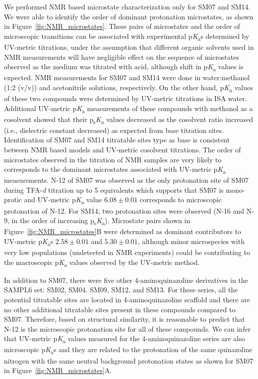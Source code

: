 \documentclass[9pt,lineno]{elife}
\newcommand{\pKa}{p\textit{K}\textsubscript{a}}
\newcommand{\psKa}{p\textsubscript{s}\textit{K}\textsubscript{a}}
\begin{document}
We performed NMR based microstate characterization only for SM07 and SM14. We were able to identify the order of dominant protonation microstates, as shown in Figure~\ref{fig:NMR_microstates}. 
These pairs of microstates and the order of microscopic transitions can be associated with experimental \pKa s determined by UV-metric titrations, under the assumption that different organic solvents used in NMR measurements will have negligible effect on the sequence of microstates observed as the medium was titrated with acid, although shift in \pKa{} values is expected. NMR measurements for SM07 and SM14 were done in water:methanol (1:2 (v/v)) and acetonitrile solutions, respectively. 
On the other hand, \pKa{} values of these two compounds were determined by UV-metric titrations in ISA water. Additional UV-metric \pKa{} measurements of these compounds with methanol as a cosolvent showed that their \psKa{} values decreased as the cosolvent ratio increased (i.e., dielectric constant decreased) as expected from base titration sites. 
Identification of SM07 and SM14 titratable sites type as base is consistent between NMR based models and UV-metric cosolvent titrations. 
The order of microstates observed in the titration of NMR samples are very likely to corresponds to the dominant microstates associated with UV-metric \pKa{} measurements. N-12 of SM07 was observed as the only protonation site of SM07 during TFA-\textit{d} titration up to 5 equivalents which supports that SM07 is mono-protic and UV-metric \pKa{} value $6.08 \pm 0.01$ corresponds to microscopic protonation of N-12. For SM14, two protonation sites were observed (N-16 and N-9, in the order of increasing \psKa). Microstate pairs shown in Figure~\ref{fig:NMR_microstates}B were determined as dominant contributors to UV-metric \pKa{}s $2.58 \pm 0.01 $ and $5.30 \pm 0.01$, although minor microspecies with very low populations (undetected in NMR experiments) could be contributing to the macroscopic \pKa{} values observed by the UV-metric method. 

In addition to SM07, there were five other 4-aminoquinazoline derivatives in the SAMPL6 set: SM02, SM04. SM09, SM12, and SM13. 
For these series, all the potential titratable sites are located in 4-aminoquinazoline scaffold and there are no other additional titratable sites present in these compounds compared to SM07. 
Therefore, based on structural similarity, it is reasonable to predict that N-12 is the microscopic protonation site for all of these compounds. 
We can infer that UV-metric \pKa{} values measured for the 4-aminoquinazoline series are also microscopic \pKa{}s and they are related to the protonation of the same quinazoline nitrogen with the same neutral background protonation states as shown for SM07 in Figure~\ref{fig:NMR_microstates}A.
\end{document}
